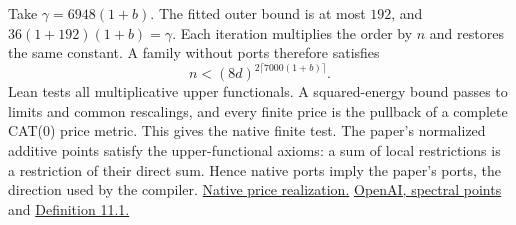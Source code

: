 \documentclass[11pt,letterpaper]{article}
\newcommand{\paperpath}{https://github.com/openai/math/blob/3344da59991ed94f9ba711217b29c1d760badfa6/preprints}
\newcommand{\geomref}[2]{\href{\paperpath/Euclidean-geometry-in-the-asymptotic-spectrum-of-tensors-November-24-2026/build/#1}{#2}}
\begin{document}
Take \(\gamma=6948(1+b)\). The fitted outer bound is at most \(192\), and
\(36(1+192)(1+b)=\gamma\). Each iteration multiplies the order by \(n\)
and restores the same constant. A family without ports therefore satisfies
\[
                  n<(8d)^{2\lceil7000(1+b)\rceil}.
\]
Lean tests all multiplicative upper functionals. A squared-energy bound passes
to limits and common rescalings, and every finite price is the pullback of a
complete CAT(0) price metric. This gives the native finite test. The paper's
normalized additive points satisfy the upper-functional axioms: a sum of local
restrictions is a restriction of their direct sum. Hence native ports imply the
paper's ports, the direction used by the compiler.
\href{https://github.com/cslib-community/cslib-frontier/blob/c258d64a931afcaaf6259abeec215b32e72360e2/CslibFrontier/Computability/Circuit/Arithmetic/Separation/Curvature/Curvature.lean}{Native price realization.}
\geomref{prices.tex}{OpenAI, spectral points}
and \geomref{port-graphs.tex\#L10-L36}{Definition 11.1.}
\end{document}
